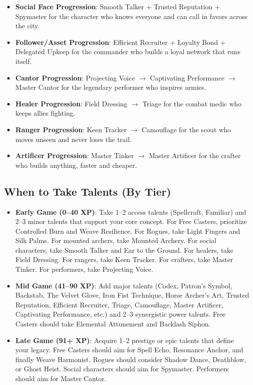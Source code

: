 {\begin{itemize}
  \item \textbf{Social Face Progression}: Smooth Talker + Trusted Reputation + Spymaster for the character who knows everyone and can call in favors across the city.
  \item \textbf{Follower/Asset Progression}: Efficient Recruiter + Loyalty Bond + Delegated Upkeep for the commander who builds a loyal network that runs itself.
  \item \textbf{Cantor Progression}: Projecting Voice $\rightarrow$ Captivating Performance $\rightarrow$ Master Cantor for the legendary performer who inspires armies.
  \item \textbf{Healer Progression}: Field Dressing $\rightarrow$ Triage for the combat medic who keeps allies fighting.
  \item \textbf{Ranger Progression}: Keen Tracker $\rightarrow$ Camouflage for the scout who moves unseen and never loses the trail.
  \item \textbf{Artificer Progression}: Master Tinker $\rightarrow$ Master Artificer for the crafter who builds anything, faster and cheaper.
\end{itemize}

\subsection*{When to Take Talents (By Tier)}
\label{sec:when-to-take-talents}
\begin{itemize}
  \item \textbf{Early Game (0--40 XP)}: Take 1--2 access talents (Spellcraft, Familiar) and 2--3 minor talents that support your core concept. For Free Casters, prioritize Controlled Burn and Weave Resilience. For Rogues, take Light Fingers and Silk Palms. For mounted archers, take Mounted Archery. For social characters, take Smooth Talker and Ear to the Ground. For healers, take Field Dressing. For rangers, take Keen Tracker. For crafters, take Master Tinker. For performers, take Projecting Voice.
  \item \textbf{Mid Game (41--90 XP)}: Add major talents (Codex, Patron's Symbol, Backstab, The Velvet Glove, Iron Fist Technique, Horse Archer's Art, Trusted Reputation, Efficient Recruiter, Triage, Camouflage, Master Artificer, Captivating Performance, etc.) and 2--3 synergistic power talents. Free Casters should take Elemental Attunement and Backlash Siphon.
  \item \textbf{Late Game (91+ XP)}: Acquire 1--2 prestige or epic talents that define your legacy. Free Casters should aim for Spell Echo, Resonance Anchor, and finally Weave Harmonist. Rogues should consider Shadow Dance, Deathblow, or Ghost Heist. Social characters should aim for Spymaster. Performers should aim for Master Cantor.
\end{itemize}

}
